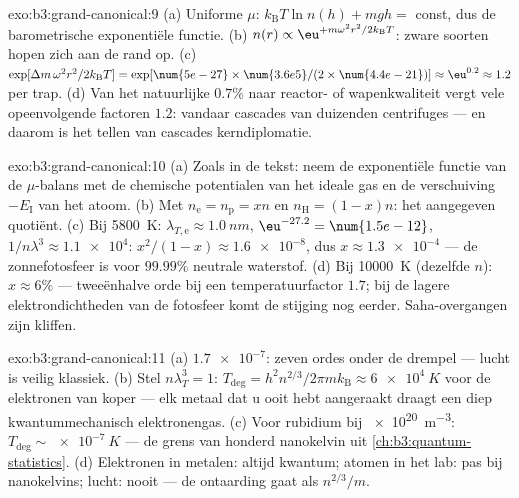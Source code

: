 \begin{solution}{exo:b3:grand-canonical:9}
(a) Uniforme $\mu$: $k_{\text{B}}T\ln n(h) + mgh = $ const, dus de
barometrische exponentiële functie. (b) $n(r) \propto
\eu^{+m\omega^2r^2/2k_{\text{B}}T}$: zware soorten hopen zich aan de rand
op. (c) $\exp[\Delta m\,\omega^2r^2/2k_{\text{B}}T] =
\exp[\num{5e-27} \times \num{3.6e5}/(2 \times \num{4.4e-21})]
\approx \eu^{0.2} \approx 1.2$ per trap. (d) Van het natuurlijke $0.7\%$
naar reactor- of wapenkwaliteit vergt vele opeenvolgende factoren $1.2$:
vandaar cascades van duizenden centrifuges --- en daarom is het tellen van
cascades kerndiplomatie.
\end{solution}

\begin{solution}{exo:b3:grand-canonical:10}
(a) Zoals in de tekst: neem de exponentiële functie van de $\mu$-balans
met de chemische potentialen van het ideale gas en de verschuiving
$-E_{\text{I}}$ van het atoom. (b) Met $n_{\text{e}} = n_{\text{p}} = xn$
en $n_{\text{H}} =
(1-x)n$: het aangegeven quotiënt. (c) Bij
\qty{5800}{K}: $\lambda_{T,\text{e}} \approx \qty{1.0}{nm}$,
$\eu^{-27.2} = \num{1.5e-12}$, $1/n\lambda^3 \approx \num{1.1e4}$:
$x^2/(1-x) \approx \num{1.6e-8}$, dus $x \approx \num{1.3e-4}$ --- de
zonnefotosfeer is voor $99.99\%$ neutrale waterstof. (d) Bij
\qty{10000}{K} (dezelfde $n$): $x \approx 6\%$ --- tweeënhalve orde bij een
temperatuurfactor $1.7$; bij de lagere elektrondichtheden van de fotosfeer
komt de stijging nog eerder. Saha-overgangen zijn kliffen.
\end{solution}

\begin{solution}{exo:b3:grand-canonical:11}
(a) $\num{1.7e-7}$: zeven ordes onder de drempel --- lucht is veilig
klassiek. (b) Stel $n\lambda_T^3 = 1$: $T_{\text{deg}} =
h^2n^{2/3}/2\pi mk_{\text{B}} \approx \qty{6e4}{K}$ voor de elektronen van
koper --- elk metaal dat u ooit hebt aangeraakt draagt een diep
kwantummechanisch elektronengas. (c) Voor rubidium bij \qty{e20}{m^{-3}}:
$T_{\text{deg}} \sim \qty{e-7}{K}$ --- de grens van honderd nanokelvin uit
\cref{ch:b3:quantum-statistics}. (d) Elektronen in metalen: altijd kwantum;
atomen in het lab: pas bij nanokelvins; lucht: nooit --- de ontaarding gaat
als $n^{2/3}/m$.
\end{solution}

